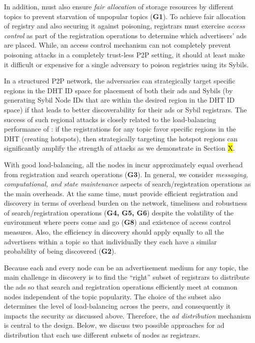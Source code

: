 In addition, \sysname must also ensure \textit{fair allocation} of storage resources by different topics to prevent starvation of unpopular topics (\textbf{G1}). To achieve fair allocation of registry and also securing it against poisoning, registrars must exercise \textit{access control} as part of the registration operations to determine which advertisers' ads are placed. While, an access control mechanism can not completely prevent poisoning attacks in a completely trust-less P2P setting, it should at least make it difficult or expensive for a single adversary to poison registries using its Sybils. 

In a structured P2P network, the adversaries can strategically target specific regions in the DHT ID space for placement of both their ads and Sybils (\ie by generating Sybil Node IDs that are within the desired region in the DHT ID space) if that leads to better discoverability for their ads or Sybil registrars. The success of such regional attacks is closely related to the load-balancing performance of \sysname: if the registrations for any topic favor specific regions in the DHT (\ie creating hotspots), then strategically targeting the hotspot regions can significantly amplify the strength of attacks as we demonstrate in Section \hl{X}. 

 With good load-balancing, all the nodes in \sysname incur approximately equal overhead from registration and search operations (\textbf{G3}). In general, we consider \textit{messaging, computational, and state maintenance} aspects of search/registration operations as the main overheads. At the same time, \sysname must provide efficient registration and discovery in terms of overhead burden on the network, timeliness and robustness of search/registration operations (\textbf{G4, G5, G6}) despite the volatility of the environment where peers come and go (\textbf{G8}) and existence of access control measures. Also, the efficiency in discovery should apply equally to all the advertisers within a topic so that individually they each have a similar probability of being discovered (\textbf{G2}). 

Because each and every node can be an advertisement medium for any topic, the main challenge in discovery is to find the ``right'' subset of registrars to distribute the ads so that search and registration operations efficiently meet at common nodes independent of the topic popularity. The choice of the subset also determines the level of load-balancing across the peers, and consequently it impacts the security as discussed above. Therefore, the \textit{ad distribution} mechanism is central to the \sysname design. Below, we discuss two possible approaches for ad distribution that each use different subsets of nodes as registrars. 

